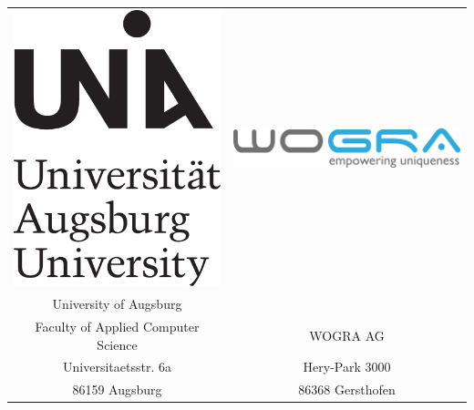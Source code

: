 \vspace{0.5cm}
\begin{center}
    \begin{tabular}{ c c }
		\vspace{1cm}
		\includegraphics[scale=0.25]{img/logos/Uni_Aug_Logo_Basis_pos_A} &
		\includegraphics[scale=0.25]{img/logos/WOGRA}
		\\
        \Large University of Augsburg & \\
		\Large Faculty of Applied Computer Science & \Large WOGRA AG\\
        \Large Universitaetsstr. 6a & \Large Hery-Park 3000\\
		\Large 86159 Augsburg & \Large 86368 Gersthofen\\
	\end{tabular}
\end{center}


